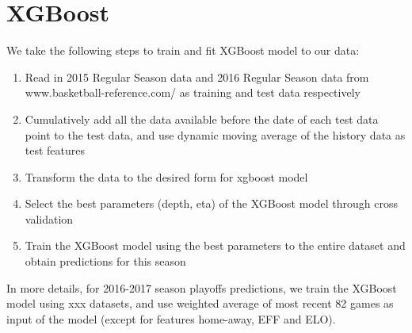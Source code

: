 \section{XGBoost}

We take the following steps to train and fit XGBoost model to our data: 
\begin{enumerate}
	\item Read in 2015 Regular Season data and 2016 Regular Season data from 
	    www.basketball-reference.com/ as training and test data respectively
	\item Cumulatively add all the data available before the date of each test
	    data point to the test data, and use dynamic moving average of the 
	    history data as test features
	\item Transform the data to the desired form for xgboost model
	\item Select the best parameters (depth, eta) of the XGBoost model through
	    cross validation
	\item Train the XGBoost model using the best parameters to the entire
	    dataset and obtain predictions for this season
\end{enumerate}


In more details, for 2016-2017 season playoffs predictions, we train the XGBoost
model using xxx datasets, and use weighted average of most recent 82 games as 
input of the model (except for features home-away, EFF and ELO).
